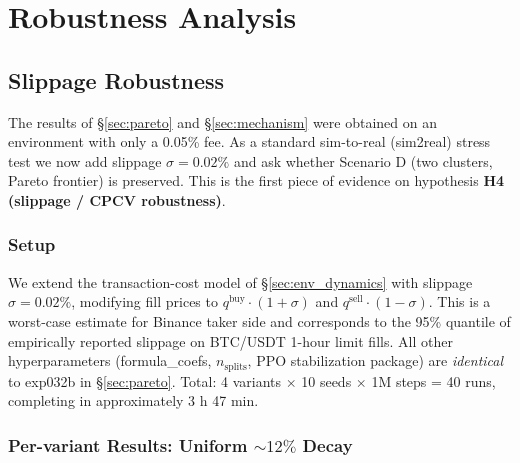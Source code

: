 \documentclass[11pt, a4paper]{article}
\begin{document}
\section{Robustness Analysis}
\label{sec:robustness}

\subsection{Slippage Robustness}
\label{sec:slippage}

The results of \S\ref{sec:pareto} and \S\ref{sec:mechanism} were obtained on
an environment with only a 0.05\% fee. As a standard sim-to-real (sim2real)
stress test we now add slippage $\sigma = 0.02\%$ and ask whether Scenario D
(two clusters,
Pareto frontier) is preserved. This is the first piece of evidence on
hypothesis \textbf{H4 (slippage / CPCV robustness)}.

\subsubsection{Setup}
\label{sec:slippage_setup}

We extend the transaction-cost model of \S\ref{sec:env_dynamics} with
slippage $\sigma = 0.02\%$, modifying fill prices to
$q^{\mathrm{buy}} \cdot (1+\sigma)$ and $q^{\mathrm{sell}} \cdot (1-\sigma)$.
This is a worst-case estimate for Binance taker side and corresponds to the
95\% quantile of empirically reported slippage on BTC/USDT 1-hour limit
fills. All other hyperparameters (formula\_coefs, $n_{\text{splits}}$,
PPO stabilization package) are \emph{identical} to exp032b in
\S\ref{sec:pareto}. Total: 4 variants $\times$ 10 seeds $\times$ 1M steps =
40 runs, completing in approximately 3 h 47 min.

\subsubsection{Per-variant Results: Uniform $\sim 12\%$ Decay}
\label{sec:slippage_per_variant}
\end{document}
